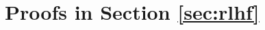 \documentclass[11pt]{article}
\providecommand{\gen}{\operatorname{gen}}
\begin{document}






\section{Proofs in Section \ref{sec:rlhf}}\label{se:API}
\end{document}

